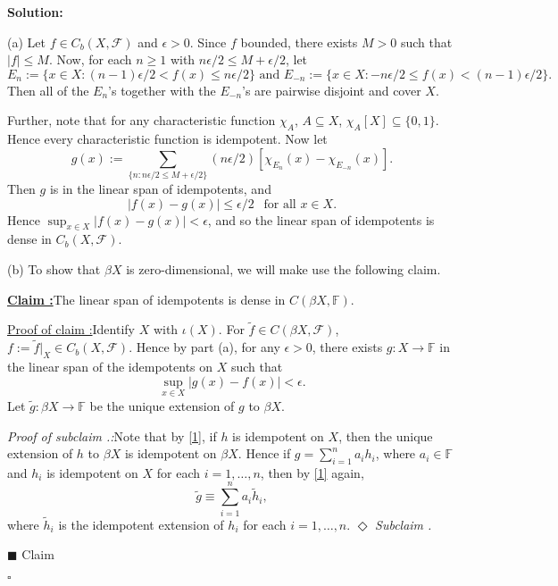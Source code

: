 \documentclass[12pt]{article}
\newcounter{ProofCounter}
\newcounter{ClaimCounter}[ProofCounter]
\newcounter{SubClaimCounter}[ClaimCounter]
\newenvironment{Solution}{\stepcounter{ProofCounter}\textbf{Solution:}}{\hfill$\square$}
\newenvironment{claim}[1]{\vspace{1mm}\stepcounter{ClaimCounter}\par\noindent\underline{\bf Claim \theClaimCounter:}\space#1}{}
\newenvironment{claimproof}[1]{\par\noindent\underline{Proof of claim \theClaimCounter:}\space#1}{\hfill $\blacksquare$ Claim \theClaimCounter}
\newenvironment{subclaim}[1]{\stepcounter{SubClaimCounter}\par\noindent\emph{Subclaim \theClaimCounter.\theSubClaimCounter:}\space#1}{}
\newenvironment{subclaimproof}[1]{\par\noindent\emph{Proof of subclaim \theClaimCounter.\theSubClaimCounter:}\space#1}{\hfill
$\Diamond$ \emph{Subclaim \theClaimCounter.\theSubClaimCounter}}
\begin{document}
\begin{Solution}
\begin{enumerate}
      (a) Let $f \in C_b(X, \mathcal{F})$ and $\epsilon > 0$. Since $f$ bounded, there exists $M > 0$ such that $|f| \leq M$. Now, for each $n \geq 1$
      with $n \epsilon / 2 \leq M + \epsilon / 2$, let 
      \[
        E_n := \{ x \in X : (n - 1)\epsilon / 2 < f(x) \leq n \epsilon / 2\} \text{ and } E_{-n} := \{x \in X : -n \epsilon / 2 \leq f(x) <
        (n-1)\epsilon / 2 \}.
      \]
      Then all of the $E_n$'s together with the $E_{-n}$'s are pairwise disjoint and cover $X$.

      Further, note that for any characteristic function $\chi_A$, $A \subseteq X$, $\chi_A[X] \subseteq
      \{0,1\}$. Hence every characteristic function is idempotent. Now let 
      \[
        g(x) := \sum_{\{n : n\epsilon / 2 \leq M + \epsilon / 2\}} (n\epsilon / 2)[ \chi_{E_n}(x) - \chi_{E_{-n}}(x)].
      \]
      Then $g$ is in the linear span of idempotents, and 
      \[
        |f(x) - g(x)| \leq \epsilon / 2 \ \ \text{ for all } x \in X.
      \]
      Hence $\sup_{x \in X}|f(x) - g(x)| < \epsilon$, and so the linear span of idempotents is dense in $C_b(X, \mathcal{F})$.

      (b) To show that $\beta X$ is zero-dimensional, we will make use the following claim.
      \begin{claim}
        The linear span of idempotents is dense in $C(\beta X, \mathbb{F})$.
      \end{claim}
      \begin{claimproof}
        Identify $X$ with $\iota(X)$.
        For $\tilde{f} \in C(\beta X, \mathcal{F})$, $f := \tilde{f}\big|_{X} \in C_b(X, \mathcal{F})$. Hence by part (a), for any $\epsilon > 0$, 
        there exists $g : X \rightarrow \mathbb{F}$ in the linear span of the idempotents on $X$ such that
        \[
          \sup_{x \in X}|g(x) - f(x)| < \epsilon.
        \]
        Let $\tilde{g} : \beta X \rightarrow \mathbb{F}$ be the unique extension of $g$ to $\beta X$. 
        \begin{subclaimproof}
          Note that by \eqref{1}, if $h$ is idempotent on $X$, then the unique extension of $h$ to $\beta X$ is idempotent on $\beta X$.
          Hence if $g = \sum_{i=1}^{n}a_i h_i$, where $a_i \in \mathbb{F}$ and $h_i$ is idempotent on $X$ for each $i = 1, \dots, n$, then by \eqref{1} again,
          \[
            \tilde{g} \equiv \sum_{i=1}^{n}a_i \tilde{h}_i,
          \]
          where $\tilde{h}_i$ is the idempotent extension of $h_i$ for each $i = 1,\dots, n$.
        \end{subclaimproof}


\end{claimproof}
\end{enumerate}
\end{Solution}
\end{document}
